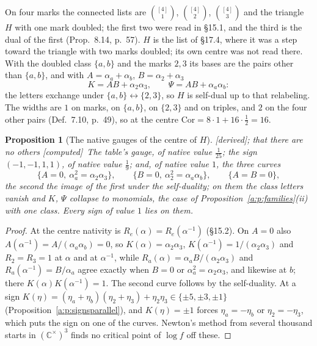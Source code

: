 \documentclass[11pt]{article}
\theoremstyle{plain}
\newtheorem{proposition}{Proposition}[section]
\theoremstyle{definition}
\theoremstyle{remark}
\newcommand{\derived}{\textup{[derived]}}
\newcommand{\computed}{\textup{[computed]}}
\begin{document}
On four marks the connected lists are $\binom{[4]}1$, $\binom{[4]}2$, $\binom{[4]}3$ and the triangle $H$ with one mark doubled; the first two were read in \S15.1, and the third is the dual of the first (Prop.~8.14, p.~57). $H$ is the list of \S17.4, where it was a step toward the triangle with two marks doubled; its own centre was not read there. With the doubled class $\{a,b\}$ and the marks $2,3$ its bases are the pairs other than $\{a,b\}$, and with $A=\alpha_a+\alpha_b$, $B=\alpha_2+\alpha_3$
\[
K=AB+\alpha_2\alpha_3,\qquad \Psi=AB+\alpha_a\alpha_b :
\]
the letters exchange under $\{a,b\}\leftrightarrow\{2,3\}$, so $H$ is self-dual up to that relabeling. The widths are $1$ on marks, on $\{a,b\}$, on $\{2,3\}$ and on triples, and $2$ on the four other pairs (Def.~7.10, p.~49), so at the centre $\mathrm{Cor}=8\cdot1+16\cdot\frac12=16$.

\begin{proposition}[The native gauges of the centre of $H$]\label{a:p:Hgauges}\derived; that there are no others \computed\
The table's gauge, of native value $\frac1{25}$; the sign $(-1,-1,1,1)$, of native value $\frac19$; and, of native value $1$, the three curves
\[
\{A=0,\ \alpha_a^2=\alpha_2\alpha_3\},\qquad \{B=0,\ \alpha_2^2=\alpha_a\alpha_b\},\qquad \{A=B=0\},
\]
the second the image of the first under the self-duality; on them the class letters vanish and $K$, $\Psi$ collapse to monomials, the case of Proposition~\ref{a:p:families}(ii) with one class. Every sign of value $1$ lies on them.
\end{proposition}

\begin{proof}
At the centre nativity is $R_e(\alpha)=R_e(\alpha^{-1})$ (\S15.2). On $A=0$ also $A(\alpha^{-1})=A/(\alpha_a\alpha_b)=0$, so $K(\alpha)=\alpha_2\alpha_3$, $K(\alpha^{-1})=1/(\alpha_2\alpha_3)$ and $R_2=R_3=1$ at $\alpha$ and at $\alpha^{-1}$, while $R_a(\alpha)=\alpha_aB/(\alpha_2\alpha_3)$ and $R_a(\alpha^{-1})=B/\alpha_a$ agree exactly when $B=0$ or $\alpha_a^2=\alpha_2\alpha_3$, and likewise at $b$; there $K(\alpha)K(\alpha^{-1})=1$. The second curve follows by the self-duality. At a sign $K(\eta)=(\eta_a+\eta_b)(\eta_2+\eta_3)+\eta_2\eta_3\in\{\pm5,\pm3,\pm1\}$ (Proposition~\ref{a:p:signsparallel}), and $K(\eta)=\pm1$ forces $\eta_a=-\eta_b$ or $\eta_2=-\eta_3$, which puts the sign on one of the curves. Newton's method from several thousand starts in $(\mathbb C^\times)^3$ finds no critical point of $\log f$ off these.
\end{proof}
\end{document}
